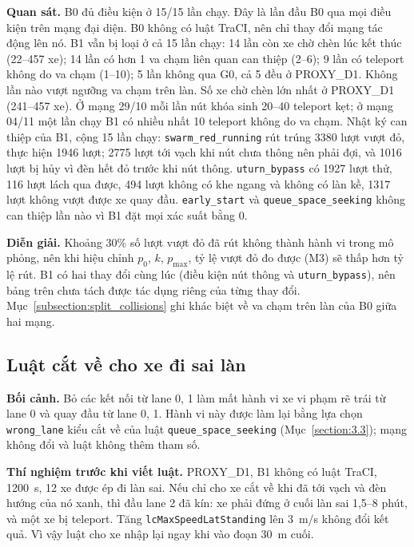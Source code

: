 \documentclass[../main.tex]{subfiles}
\begin{document}
\textbf{Quan sát.} B0 đủ điều kiện ở 15/15 lần chạy. Đây là lần đầu B0 qua mọi điều kiện trên mạng đại diện. B0 không có luật TraCI, nên chỉ thay đổi mạng tác động lên nó. B1 vẫn bị loại ở cả 15 lần chạy: 14 lần còn xe chờ chèn lúc kết thúc (22--457 xe); 14 lần có hơn 1 va chạm liên quan can thiệp (2--6); 9 lần có teleport không do va chạm (1--10); 5 lần không qua G0, cả 5 đều ở PROXY\_D1. Không lần nào vượt ngưỡng va chạm trên làn. Số xe chờ chèn lớn nhất ở PROXY\_D1 (241--457 xe). Ở mạng 29/10 mỗi lần nút khóa sinh 20--40 teleport kẹt; ở mạng 04/11 một lần chạy B1 có nhiều nhất 10 teleport không do va chạm. Nhật ký can thiệp của B1, cộng 15 lần chạy: \texttt{swarm\_red\_running} rút trúng 3380 lượt vượt đỏ, thực hiện 1946 lượt; 2775 lượt tới vạch khi nút chưa thông nên phải đợi, và 1016 lượt bị hủy vì đèn hết đỏ trước khi nút thông. \texttt{uturn\_bypass} có 1927 lượt thử, 116 lượt lách qua được, 494 lượt không có khe ngang và không có làn kề, 1317 lượt không vượt được xe quay đầu. \texttt{early\_start} và \texttt{queue\_space\_seeking} không can thiệp lần nào vì B1 đặt mọi xác suất bằng 0.

\textbf{Diễn giải.} Khoảng 30\% số lượt vượt đỏ đã rút không thành hành vi trong mô phỏng, nên khi hiệu chỉnh $p_0$, $k$, $p_{\max}$, tỷ lệ vượt đỏ đo được (M3) sẽ thấp hơn tỷ lệ rút. B1 có hai thay đổi cùng lúc (điều kiện nút thông và \texttt{uturn\_bypass}), nên bảng trên chưa tách được tác dụng riêng của từng thay đổi. Mục~\ref{subsection:split_collisions} ghi khác biệt về va chạm trên làn của B0 giữa hai mạng.

\subsection{Luật cắt về cho xe đi sai làn}
\label{subsection:cutback}

\textbf{Bối cảnh.} Bỏ các kết nối từ lane 0, 1 làm mất hành vi xe vi phạm rẽ trái từ lane 0 và quay đầu từ lane 0, 1. Hành vi này được làm lại bằng lựa chọn \texttt{wrong\_lane} kiểu cắt về của luật \texttt{queue\_space\_seeking} (Mục~\ref{section:3.3}); mạng không đổi và luật không thêm tham số.

\textbf{Thí nghiệm trước khi viết luật.} PROXY\_D1, B1 không có luật TraCI, 1200~s, 12 xe được ép đi làn sai. Nếu chỉ cho xe cắt về khi đã tới vạch và đèn hướng của nó xanh, thì đầu lane 2 đã kín: xe phải đứng ở cuối làn sai 1,5--8 phút, và một xe bị teleport. Tăng \texttt{lcMaxSpeedLatStanding} lên 3~m/s không đổi kết quả. Vì vậy luật cho xe nhập lại ngay khi vào đoạn 30~m cuối.
\end{document}
